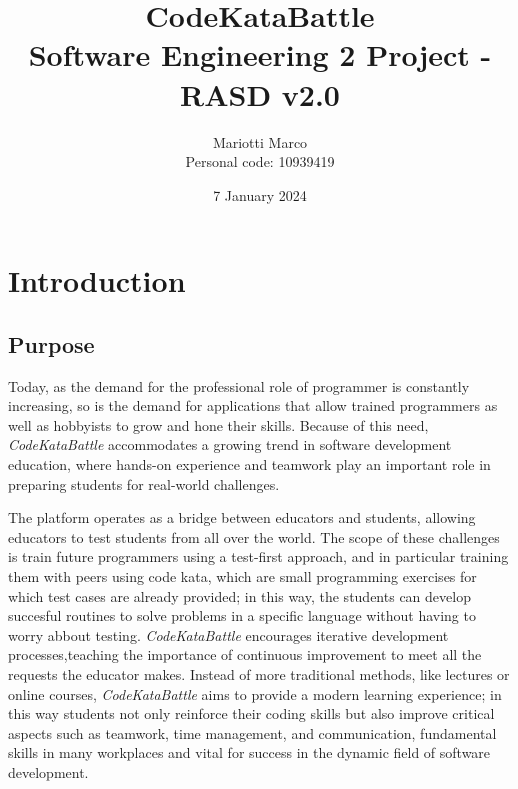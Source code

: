 \documentclass[a4paper, 11pt, titlepage]{article}
\title{
    CodeKataBattle\\
    \large Software Engineering 2 Project - RASD v2.0
}
\author{
  Mariotti Marco\\
  Personal code: 10939419
}
\date{7 January 2024}
\begin{document}
\maketitle

\tableofcontents

\newpage

\section{Introduction}

\subsection{Purpose}

Today, as the demand for the professional role of programmer is constantly increasing, so is the demand for applications that allow trained programmers as well as hobbyists to grow and hone their skills. Because of this need, \textit{CodeKataBattle} accommodates a growing trend in software development education, where hands-on experience and teamwork play an important role in preparing students for real-world challenges.

The platform operates as a bridge between educators and students, allowing educators to test students from all over the world.
The scope of these challenges is train future programmers using a test-first approach, and in particular training them with peers using 
code kata, which are small programming exercises for which test cases are already provided; in this way, the students can develop succesful routines to solve problems in a specific language without having to worry abbout testing.\newline
\textit{CodeKataBattle} encourages iterative development processes,teaching the importance of continuous improvement to meet all the requests the educator makes.
Instead of more traditional methods, like lectures or online courses, \textit{CodeKataBattle} aims to provide a modern learning experience; in this way students not only reinforce their coding skills but also improve critical aspects such as teamwork, time management, and communication, fundamental skills in many workplaces and vital for success in the dynamic field of software development.
\end{document}
